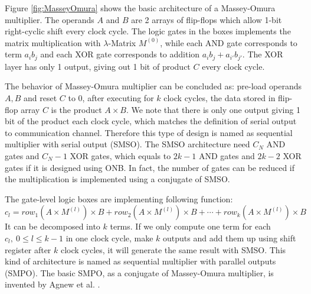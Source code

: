 \begin{figure}[H]
\end{figure}

Figure \ref{fig:MasseyOmura} shows the basic architecture of a Massey-Omura multiplier. The operands
$A$ and $B$ are 2 arrays of flip-flops which allow 1-bit right-cyclic shift every clock cycle.
The logic gates in the boxes implements the matrix multiplication with $\lambda$-Matrix $M^{(0)}$, 
while each AND gate corresponds to term $a_ib_j$ and each XOR gate corresponds to addition $a_ib_j+a_{i'}b_{j'}$. 
The XOR layer has only 1 output, giving out 1 bit of product $C$ every clock cycle.

The behavior of Massey-Omura multiplier can be concluded as: pre-load operands $A,B$ and reset $C$ to 0, after 
executing for $k$ clock cycles, the data stored in flip-flop array $C$ is the product $A\times B$.
We note that there is only one output giving 1 bit of the product each clock cycle, which matches the 
definition of serial output to communication channel. Therefore this type of design is named as 
sequential multiplier with serial output (SMSO).
The SMSO architecture need $C_N$ AND gates and $C_N-1$ XOR gates, which equals to $2k-1$ AND gates and $2k-2$ XOR gates
if it is designed using ONB. In fact, the number of gates can be reduced if the multiplication is 
implemented using a conjugate of SMSO.

The gate-level logic boxes are implementing following function:
\begin{equation}
\label{eqn:SMPOterms}
c_l = row_1(A\times M^{(l)}) \times B + row_2(A\times M^{(l)}) \times B + \cdots + row_{k}(A\times M^{(l)}) \times B
\end{equation}
It can be decomposed into $k$ terms. If we only compute one term for each $c_l,~0\leq l\leq k-1$ in one 
clock cycle, make $k$ outputs and add them up using shift register after $k$ clock cycles, 
it will generate the same result with SMSO. This kind of architecture is named as 
sequential multiplier with parallel outputs (SMPO). The basic SMPO, as a conjugate of Massey-Omura multiplier,
is invented by Agnew et al. \cite{agnew1991implementation}.


